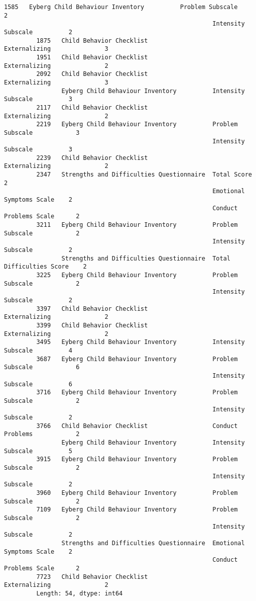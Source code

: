 \documentclass{article}
\begin{document}
\begin{Verbatim}[commandchars=\\\{\}]
         1585   Eyberg Child Behaviour Inventory          Problem Subscale            2
                                                          Intensity Subscale          2
         1875   Child Behavior Checklist                  Externalizing               3
         1951   Child Behavior Checklist                  Externalizing               2
         2092   Child Behavior Checklist                  Externalizing               3
                Eyberg Child Behaviour Inventory          Intensity Subscale          3
         2117   Child Behavior Checklist                  Externalizing               2
         2219   Eyberg Child Behaviour Inventory          Problem Subscale            3
                                                          Intensity Subscale          3
         2239   Child Behavior Checklist                  Externalizing               2
         2347   Strengths and Difficulties Questionnaire  Total Score                 2
                                                          Emotional Symptoms Scale    2
                                                          Conduct Problems Scale      2
         3211   Eyberg Child Behaviour Inventory          Problem Subscale            2
                                                          Intensity Subscale          2
                Strengths and Difficulties Questionnaire  Total Difficulties Score    2
         3225   Eyberg Child Behaviour Inventory          Problem Subscale            2
                                                          Intensity Subscale          2
         3397   Child Behavior Checklist                  Externalizing               2
         3399   Child Behavior Checklist                  Externalizing               2
         3495   Eyberg Child Behaviour Inventory          Intensity Subscale          4
         3687   Eyberg Child Behaviour Inventory          Problem Subscale            6
                                                          Intensity Subscale          6
         3716   Eyberg Child Behaviour Inventory          Problem Subscale            2
                                                          Intensity Subscale          2
         3766   Child Behavior Checklist                  Conduct Problems            2
                Eyberg Child Behaviour Inventory          Intensity Subscale          5
         3915   Eyberg Child Behaviour Inventory          Problem Subscale            2
                                                          Intensity Subscale          2
         3960   Eyberg Child Behaviour Inventory          Problem Subscale            2
         7109   Eyberg Child Behaviour Inventory          Problem Subscale            2
                                                          Intensity Subscale          2
                Strengths and Difficulties Questionnaire  Emotional Symptoms Scale    2
                                                          Conduct Problems Scale      2
         7723   Child Behavior Checklist                  Externalizing               2
         Length: 54, dtype: int64
\end{Verbatim}
        
\end{document}
